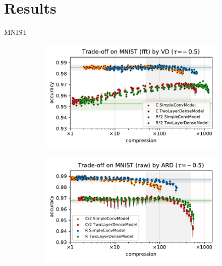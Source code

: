 \documentclass{beamer}
\begin{document}
\section{Results} %
\label{sec:results}

\begin{frame}[c]{MNIST}{\insertsection}
  \begin{figure}[t]
    \begin{subfigure}[b]{0.5\columnwidth}
      \centering
      \includegraphics[width=\linewidth]{figure__mnist-like__trade-off/appendix__cmp__VD__mnist__fft__-0.5.pdf}
    \end{subfigure}\hspace{-1em}%
    \begin{subfigure}[b]{0.5\columnwidth}
      \centering
      \includegraphics[width=\linewidth]{figure__mnist-like__trade-off/appendix__cmp__ARD__mnist__raw__-0.5.pdf}

\end{subfigure}
\end{figure}
\end{frame}
\end{document}
